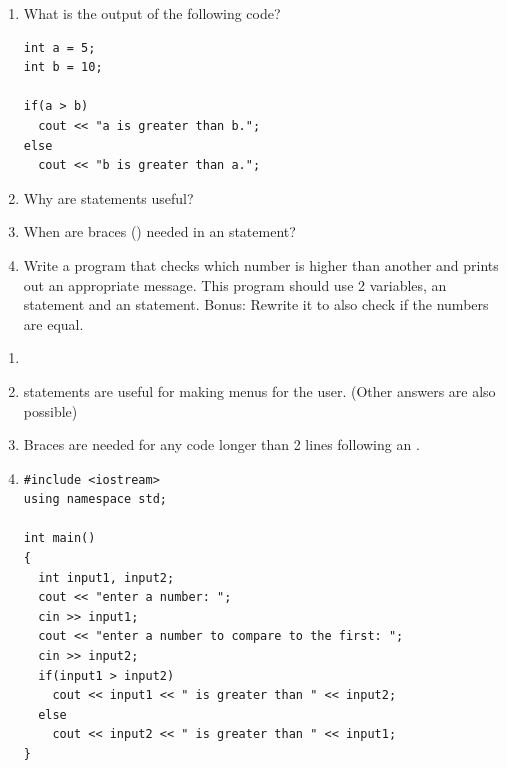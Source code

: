\begin{enumerate}
\item What is the output of the following code?

\noindent\begin{minipage}{\linewidth}\begin{lstlisting}
int a = 5;
int b = 10;

if(a > b)
  cout << "a is greater than b.";
else
  cout << "b is greater than a.";
\end{lstlisting}\end{minipage}

\item Why are  statements useful?

\item When are braces (\Code{\{\}}) needed in an  statement?

\item Write a program that checks which number is higher than another and prints out an appropriate message. This program should use 2 variables, an  statement and an  statement. Bonus: Rewrite it to also check if the numbers are equal.

\end{enumerate}


\begin{enumerate}
\item {}
\item {} statements are useful for making menus for the user. (Other answers are also possible)
\item Braces are needed for any code longer than 2 lines following an .
\item \noindent\begin{minipage}{\linewidth}\begin{lstlisting}
#include <iostream>
using namespace std;

int main()
{
  int input1, input2;
  cout << "enter a number: ";
  cin >> input1;
  cout << "enter a number to compare to the first: ";
  cin >> input2;
  if(input1 > input2)
    cout << input1 << " is greater than " << input2;
  else
    cout << input2 << " is greater than " << input1;
}
\end{lstlisting}\end{minipage}

\end{enumerate}

%

